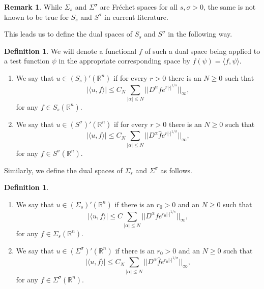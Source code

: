 \documentclass[11pt,a4paper,reqno]{amsart}
\numberwithin{equation}{section}
\theoremstyle{definition}
\theoremstyle{definition}
\newtheorem{definition}[thm]{Definition}
\newtheorem{remark}[thm]{Remark}
\begin{document}
\begin{remark}
While $\Sigma_s$ and $\Sigma^\sigma$ are Fréchet spaces for all $s,\sigma>0$, the same is not known to be true for $S_s$ and $S^\sigma$ in current literature. 
\end{remark}
This leads us to define the dual spaces of $S_s$ and $S^\sigma$ in the following way.
\begin{definition}\label{def:Sdual}
We will denote a functional $f$ of such a dual space being applied to a test function $\psi$ in the appropriate corresponding space by $f(\psi) = \langle f, \psi \rangle$.
\begin{enumerate}[label=(\roman*)]
    \item We say that $u\in (S_s)'(\mathbb{R}^n)$ if for every $r>0$ there is an $N\geq 0$ such that
    \begin{equation*}
        |\langle u, f \rangle | \leq C_N \sum_{|\alpha|\leq N} || D^\alpha f e^{r|\cdot|^{1/s}} ||_\infty,
    \end{equation*}
    for any $f\in S_s(\mathbb{R}^n)$.
     \item We say that $u\in (S^\sigma)'(\mathbb{R}^n)$ if for every $r>0$ there is an $N\geq 0$ such that
    \begin{equation*}
        |\langle u, f \rangle | \leq C_N \sum_{|\alpha|\leq N} || D^\alpha \hat{f} e^{r|\cdot|^{1/\sigma}} ||_\infty,
    \end{equation*}
    for any $f\in S^\sigma(\mathbb{R}^n)$.
\end{enumerate}
\end{definition}
Similarly, we define the dual spaces of $\Sigma_s$ and $\Sigma^\sigma$ as follows.
\begin{definition}\label{def:Sigdual}
\begin{enumerate}[label=(\roman*)]
    \item We say that $u\in (\Sigma_s)'(\mathbb{R}^n)$ if there is an $r_0>0$ and an $N\geq 0$ such that
    \begin{equation*}
        |\langle u, f \rangle | \leq C \sum_{|\alpha|\leq N} || D^\alpha f e^{r_0|\cdot|^{1/s}} ||_\infty,
    \end{equation*}
    for any $f\in \Sigma_s(\mathbb{R}^n)$.
     \item We say that $u\in (\Sigma^\sigma)'(\mathbb{R}^n)$ if there is an $r_0>0$ and an $N\geq 0$ such that
    \begin{equation*}
        |\langle u, f \rangle | \leq C_N \sum_{|\alpha|\leq N} || D^\alpha \hat{f} e^{r_0|\cdot|^{1/\sigma}} ||_\infty,
    \end{equation*}
    for any $f\in \Sigma^\sigma(\mathbb{R}^n)$.
\end{enumerate}
\end{definition}
\end{document}
